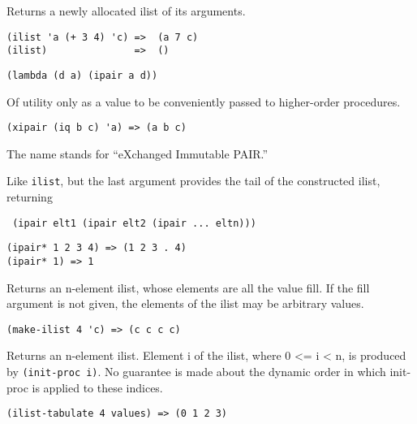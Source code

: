 \begin{entry}{%
  }

Returns a newly allocated ilist of its arguments.

\begin{verbatim}
(ilist 'a (+ 3 4) 'c) =>  (a 7 c)
(ilist)               =>  ()
\end{verbatim}
  \end{entry}

\begin{entry}{%
  }

\begin{verbatim}
(lambda (d a) (ipair a d))
\end{verbatim}

    Of utility only as a value to be conveniently passed to
    higher-order procedures.

\begin{verbatim}
(xipair (iq b c) 'a) => (a b c)
\end{verbatim}

    The name stands for ``eXchanged Immutable PAIR.'' 
\end{entry}

\begin{entry}{%
  }

Like \texttt{ilist}, but the last argument provides the
    tail of the constructed ilist, returning

    \texttt{\ (ipair\ elt1\ (ipair\ elt2\ (ipair\ ...\ eltn)))\ \ \ \
      \ }

\begin{verbatim}
(ipair* 1 2 3 4) => (1 2 3 . 4)
(ipair* 1) => 1
\end{verbatim}
\end{entry}

\begin{entry}{%
  }

  Returns an n-element ilist, whose elements are all the value
  fill. If the fill argument is not given, the elements of the ilist
  may be arbitrary values.

\begin{verbatim}
(make-ilist 4 'c) => (c c c c)
\end{verbatim}
\end{entry}

\begin{entry}{%
  }

  Returns an n-element ilist. Element i of the ilist, where 0
  \textless{}= i \textless{} n, is produced by \texttt{(init-proc\
    i)}. No guarantee is made about the dynamic order in which
  init-proc is applied to these indices.

\begin{verbatim}
(ilist-tabulate 4 values) => (0 1 2 3)
\end{verbatim}
\end{entry}

